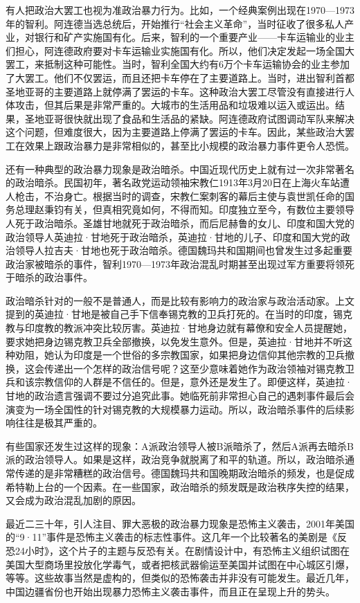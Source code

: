 有人把政治大罢工也视为准政治暴力行为。比如，一个经典案例出现在1970—1973年的智利。阿连德当选总统后，开始推行“社会主义革命”，当时征收了很多私人产业，对银行和矿产实施国有化。后来，智利的一个重要产业——卡车运输业的业主们担心，阿连德政府要对卡车运输业实施国有化。所以，他们决定发起一场全国大罢工，来抵制这种可能性。当时，智利全国大约有6万个卡车运输协会的业主参加了大罢工。他们不仅罢运，而且还把卡车停在了主要道路上。当时，进出智利首都圣地亚哥的主要道路上就停满了罢运的卡车。这种政治大罢工尽管没有直接进行人体攻击，但其后果是非常严重的。大城市的生活用品和垃圾难以运入或运出。结果，圣地亚哥很快就出现了食品和生活品的紧缺。阿连德政府试图调动军队来解决这个问题，但难度很大，因为主要道路上停满了罢运的卡车。因此，某些政治大罢工在效果上跟政治暴力是非常相似的，甚至比小规模的政治暴力事件更令人恐慌。

还有一种典型的政治暴力现象是政治暗杀。中国近现代历史上就有过一次非常著名的政治暗杀。民国初年，著名政党运动领袖宋教仁1913年3月20日在上海火车站遭人枪击，不治身亡。根据当时的调查，宋教仁案刺客的幕后主使与袁世凯任命的国务总理赵秉钧有关，但真相究竟如何，不得而知。印度独立至今，有数位主要领导人死于政治暗杀。圣雄甘地就死于政治暗杀，而后尼赫鲁的女儿、印度和国大党的政治领导人英迪拉·甘地死于政治暗杀，英迪拉·甘地的儿子、印度和国大党的政治领导人拉吉夫·甘地也死于政治暗杀。德国魏玛共和国期间也曾发生过多起重要政治家被暗杀的事件，智利1970—1973年政治混乱时期甚至出现过军方重要将领死于暗杀的政治事件。

政治暗杀针对的一般不是普通人，而是比较有影响力的政治家与政治活动家。上文提到的英迪拉·甘地是被自己手下信奉锡克教的卫兵打死的。在当时的印度，锡克教与印度教的教派冲突比较厉害。英迪拉·甘地身边就有幕僚和安全人员提醒她，要求她把身边锡克教卫兵全部撤换，以免发生意外。但是，英迪拉·甘地并不听这种劝阻，她认为印度是一个世俗的多宗教国家，如果把身边信仰其他宗教的卫兵撤换，这会传递出一个怎样的政治信号呢？这至少意味着她作为政治领袖对锡克教卫兵和该宗教信仰的人群是不信任的。但是，意外还是发生了。即便这样，英迪拉·甘地的政治遗言强调不要过分追究此事。她临死前非常担心自己的遇刺事件最后会演变为一场全国性的针对锡克教的大规模暴力运动。所以，政治暗杀事件的后续影响往往是极其严重的。

有些国家还发生过这样的现象：A派政治领导人被B派暗杀了，然后A派再去暗杀B派的政治领导人。如果是这样，政治竞争就脱离了和平的轨道。所以，政治暗杀通常传递的是非常糟糕的政治信号。德国魏玛共和国晚期政治暗杀的频发，也是促成希特勒上台的一个因素。在一些国家，政治暗杀的频发既是政治秩序失控的结果，又会成为政治混乱加剧的原因。

最近二三十年，引人注目、罪大恶极的政治暴力现象是恐怖主义袭击，2001年美国的“9·11”事件是恐怖主义袭击的标志性事件。这几年一个比较著名的美剧是《反恐24小时》，这个片子的主题与反恐有关。在剧情设计中，有恐怖主义组织试图在美国大型商场里投放化学毒气，或者把核武器偷运至美国并试图在中心城区引爆，等等。这些故事当然是虚构的，但类似的恐怖袭击并非没有可能发生。最近几年，中国边疆省份也开始出现暴力恐怖主义袭击事件，而且正在呈现上升的势头。

